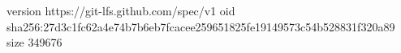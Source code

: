 version https://git-lfs.github.com/spec/v1
oid sha256:27d3c1fc62a4e74b7b6eb7fcacee259651825fe19149573c54b528831f320a89
size 349676
